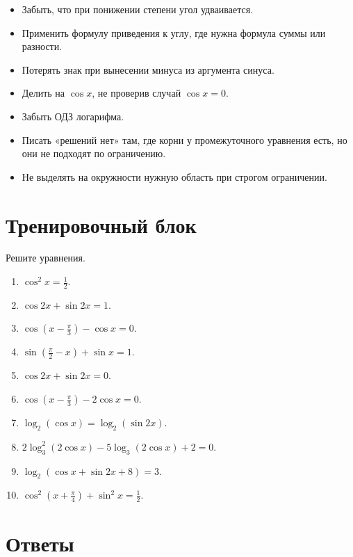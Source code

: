 \documentclass[a4paper,12pt]{article}
\begin{document}
\begin{itemize}
\item Забыть, что при понижении степени угол удваивается.
\item Применить формулу приведения к углу, где нужна формула суммы или разности.
\item Потерять знак при вынесении минуса из аргумента синуса.
\item Делить на \(\cos x\), не проверив случай \(\cos x=0\).
\item Забыть ОДЗ логарифма.
\item Писать «решений нет» там, где корни у промежуточного уравнения есть, но они не подходят по ограничению.
\item Не выделять на окружности нужную область при строгом ограничении.
\end{itemize}

\newpage

\section*{Тренировочный блок}

Решите уравнения.

\begin{enumerate}
\item \(\cos^2x=\frac12\).
\item \(\cos2x+\sin2x=1\).
\item \(\cos\left(x-\frac{\pi}{3}\right)-\cos x=0\).
\item \(\sin\left(\frac{\pi}{2}-x\right)+\sin x=1\).
\item \(\cos2x+\sin2x=0\).
\item \(\cos\left(x-\frac{\pi}{3}\right)-2\cos x=0\).
\item \(\log_2(\cos x)=\log_2(\sin2x)\).
\item \(2\log_3^2(2\cos x)-5\log_3(2\cos x)+2=0\).
\item \(\log_2(\cos x+\sin2x+8)=3\).
\item \(\cos^2\left(x+\frac{\pi}{4}\right)+\sin^2x=\frac12\).
\end{enumerate}

\newpage

\section*{Ответы}
\end{document}
